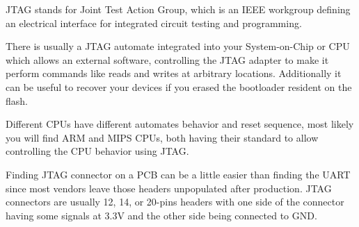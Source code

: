 JTAG stands for Joint Test Action Group, which is an IEEE workgroup
defining an electrical interface for integrated circuit testing and
programming.

There is usually a JTAG automate integrated into your System-on-Chip
or CPU which allows an external software, controlling the JTAG adapter
to make it perform commands like reads and writes at arbitrary locations.
Additionally it can be useful to recover your devices if you erased the
bootloader resident on the flash.

Different CPUs have different automates behavior and reset sequence,
most likely you will find ARM and MIPS CPUs, both having their standard
to allow controlling the CPU behavior using JTAG.

Finding JTAG connector on a PCB can be a little easier than finding the
UART since most vendors leave those headers unpopulated after production.
JTAG connectors are usually 12, 14, or 20-pins headers with one side of
the connector having some signals at 3.3V and the other side being
connected to GND.
